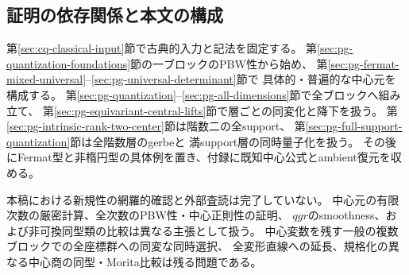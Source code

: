 \subsection*{証明の依存関係と本文の構成}
第\ref{sec:cq-classical-input}節で古典的入力と記法を固定する。
第\ref{sec:pg-quantization-foundations}節の一ブロックのPBW性から始め、
第\ref{sec:pg-fermat-mixed-universal}--\ref{sec:pg-universal-determinant}節で
具体的・普遍的な中心元を構成する。
第\ref{sec:pg-quantization}--\ref{sec:pg-all-dimensions}節で全ブロックへ組み立て、
第\ref{sec:pg-equivariant-central-lifts}節で層ごとの同変化と降下を扱う。
第\ref{sec:pg-intrinsic-rank-two-center}節は階数二の全support、
第\ref{sec:pg-full-support-quantization}節は全階数層のgerbeと
満support層の同時量子化を扱う。
その後にFermat型と非楕円型の具体例を置き、付録に既知中心公式とambient復元を収める。

本稿における新規性の網羅的確認と外部査読は完了していない。
中心元の有限次数の厳密計算、全次数のPBW性・中心正則性の証明、
$qgr$のsmoothness、および非可換同型類の比較は異なる主張として扱う。
中心変数を残す一般の複数ブロックでの全座標群への同変な同時選択、
全変形直線への延長、規格化の異なる中心商の同型・Morita比較は残る問題である。














\appendix





